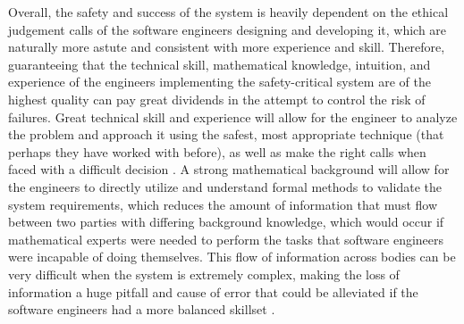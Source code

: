 \documentclass[12pt]{article}
\begin{document}
  Overall, the safety and success of the system is heavily dependent on the ethical judgement calls of the software engineers designing and developing it, which are naturally more astute and consistent with more experience and skill. Therefore, guaranteeing that the technical skill, mathematical knowledge, intuition, and experience of the engineers implementing the safety-critical system are of the highest quality can pay great dividends in the attempt to control the risk of failures. Great technical skill and experience will allow for the engineer to analyze the problem and approach it using the safest, most appropriate technique (that perhaps they have worked with before), as well as make the right calls when faced with a difficult decision \cite{ref1}. A strong mathematical background will allow for the engineers to directly utilize and understand formal methods to validate the system requirements, which reduces the amount of information that must flow between two parties with differing background knowledge, which would occur if mathematical experts were needed to perform the tasks that software engineers were incapable of doing themselves. This flow of information across bodies can be very difficult when the system is extremely complex, making the loss of information a huge pitfall and cause of error that could be alleviated if the software engineers had a more balanced skillset \cite{ref1}.

  
  
\end{document}
